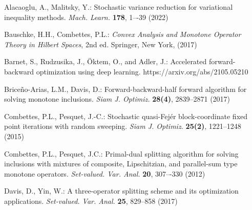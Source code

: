 \documentclass[a4paper,12pt]{article}
\theoremstyle{definition}
\begin{document}
\begin{thebibliography}{99}

Alacaoglu, A., Malitsky, Y.: Stochastic variance reduction for variational inequality methods. \textit{Mach. Learn.} \textbf{178}, 1–-39 (2022)

Bauschke, H.H., Combettes, P.L.: \textit{Convex Analysis and Monotone Operator Theory in Hilbert Spaces}, 2nd ed. Springer, New York, (2017)

Barnet, S., Rudzusika, J., \"{O}ktem, O., and Adler, J.: Accelerated forward-backward optimization using deep learning.
https://arxiv.org/abs/2105.05210



Brice\~{n}o-Arias, L.M., Davis, D.: Forward-backward-half forward algorithm for solving monotone inclusions. \textit{Siam J. Optimiz.} \textbf{28(4)}, 2839--2871 (2017)


Combettes, P.L., Pesquet, J.-C.: Stochastic quasi-Fejér block-coordinate fixed point iterations with random sweeping. \textit{Siam J. Optimiz.} \textbf{25(2)}, 1221--1248 (2015)


Combettes, P.L., Pesquet, J.C.: Primal-dual splitting algorithm for solving inclusions with mixtures of composite, Lipschitzian, and parallel-sum type monotone operators. \textit{Set-valued. Var. Anal.} \textbf{20}, 307–-330 (2012)


Davis, D., Yin, W.: A three-operator splitting scheme and its optimization applications. \textit{Set-valued. Var. Anal.} \textbf{25}, 829--858 (2017)


\end{thebibliography}
\end{document}
